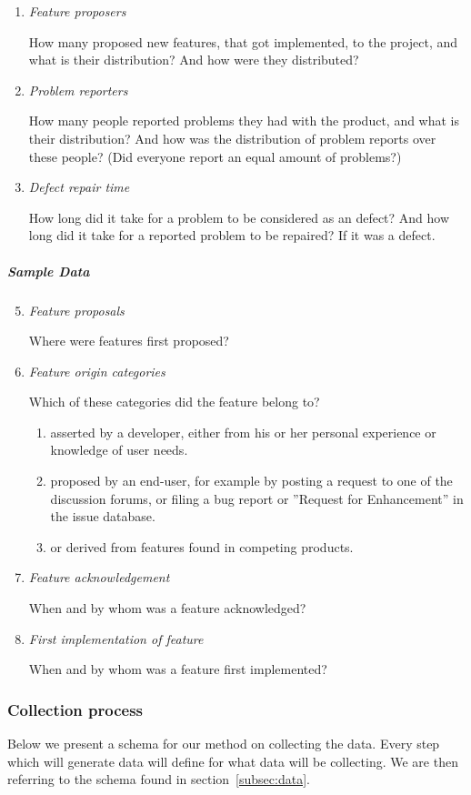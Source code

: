 \documentclass[a4paper,11pt]{article}
\begin{document}
{\begin{enumerate}[label=D\arabic*]
	How many contributors are there in the project, and what is their distribution? We define a contributor as someone who has wrote code to the project.
	\item \emph{Feature proposers}

	How many proposed new features, that got implemented, to the project, and what is their distribution? And how were they distributed?
	\item \emph{Problem reporters}

	How many people reported problems they had with the product, and what is their distribution? And how was the distribution of problem reports over these people? (Did everyone report an equal amount of problems?)
	\item \emph{Defect repair time}

	How long did it take for a problem to be considered as an defect? And how long did it take for a reported problem to be repaired? If it was a defect.
\end{enumerate}
\subparagraph{Sample Data}
\begin{enumerate}[label=D\arabic*]
	\setcounter{enumi}{4}
	\item \emph{Feature proposals}

	Where were features first proposed?
	\item \emph{Feature origin categories}

	Which of these categories did the feature belong to?
	\begin{enumerate}[label=\alph*) ]
		\item asserted by a developer, either from his or her personal experience or knowledge of user needs.
		\item proposed by an end-user, for example by posting a request to one of the discussion forums, or filing a bug report or ''Request for Enhancement'' in the issue database.
		\item or derived from features found in competing products.
	\end{enumerate}
	\item \emph{Feature acknowledgement}

	When and by whom was a feature acknowledged?
	\item \emph{First implementation of feature}

	When and by whom was a feature first implemented?
\end{enumerate}

\subsubsection{Collection process}
Below we present a schema for our method on collecting the data. Every step which will generate data will define for what data will be collecting. We are then referring to the schema found in section~\ref{subsec:data}.

}
\end{document}
